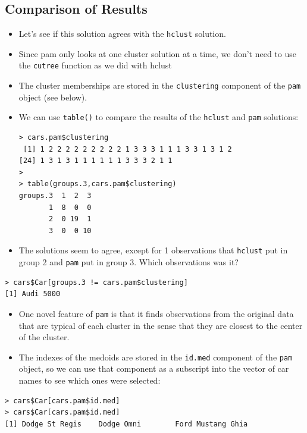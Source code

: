 \documentclass[12pt]{article}
\begin{document}
\subsection*{Comparison of Results}
\begin{itemize}
\item Let's see if this solution agrees with the \texttt{hclust} solution. 
\item Since pam only looks at one cluster solution at a time, we don't need to use the \texttt{cutree} function as we did with hclust
\item The cluster memberships are stored in the \texttt{clustering} component of the \texttt{pam} object (see below).


\item We can use \texttt{table()} to compare the results of the \texttt{hclust} and \texttt{pam} solutions:
\begin{framed}
\begin{verbatim}
> cars.pam$clustering
 [1] 1 2 2 2 2 2 2 2 2 2 1 3 3 3 1 1 1 3 3 1 3 1 2
[24] 1 3 1 3 1 1 1 1 1 1 3 3 3 2 1 1
>
> table(groups.3,cars.pam$clustering)
groups.3  1  2  3
       1  8  0  0
       2  0 19  1
       3  0  0 10
\end{verbatim}
\end{framed}
\item The solutions seem to agree, except for 1 observations that \texttt{hclust} put in group 2 and \texttt{pam} put in group 3. Which observations was it?
\end{itemize}

\begin{framed}
\begin{verbatim}
> cars$Car[groups.3 != cars.pam$clustering]
[1] Audi 5000
\end{verbatim}
\end{framed}
\newpage
\begin{itemize}
\item One novel feature of \texttt{pam} is that it finds observations from the original data that are typical of each cluster in the sense that they are closest to the center of the cluster. 
\item The indexes of the medoids are stored in the \texttt{id.med} component of the \texttt{pam} object, so we can use that component as a subscript into the vector of car names to see which ones were selected:
\end{itemize}
\begin{framed}
\begin{verbatim}
> cars$Car[cars.pam$id.med]
> cars$Car[cars.pam$id.med]
[1] Dodge St Regis    Dodge Omni        Ford Mustang Ghia
\end{verbatim}
\end{framed}
\end{document}
